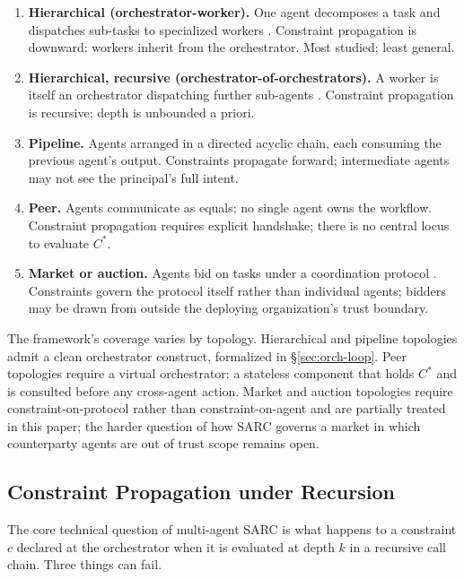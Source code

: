 \documentclass[11pt,a4paper]{article}
\theoremstyle{remark}
\begin{document}
\begin{enumerate}[leftmargin=2em,topsep=0.3em,itemsep=0.4em]
\item \textbf{Hierarchical (orchestrator-worker).} One agent decomposes a task and dispatches sub-tasks to specialized workers \cite{wu2023autogen}. Constraint propagation is downward: workers inherit from the orchestrator. Most studied; least general.
\item \textbf{Hierarchical, recursive (orchestrator-of-orchestrators).} A worker is itself an orchestrator dispatching further sub-agents \cite{hong2024metagpt}. Constraint propagation is recursive; depth is unbounded a priori.
\item \textbf{Pipeline.} Agents arranged in a directed acyclic chain, each consuming the previous agent's output. Constraints propagate forward; intermediate agents may not see the principal's full intent.
\item \textbf{Peer.} Agents communicate as equals; no single agent owns the workflow. Constraint propagation requires explicit handshake; there is no central locus to evaluate $C^*$.
\item \textbf{Market or auction.} Agents bid on tasks under a coordination protocol \cite{li2024marketauction}. Constraints govern the protocol itself rather than individual agents; bidders may be drawn from outside the deploying organization's trust boundary.
\end{enumerate}

The framework's coverage varies by topology. Hierarchical and pipeline topologies admit a clean orchestrator construct, formalized in \S\ref{sec:orch-loop}. Peer topologies require a virtual orchestrator: a stateless component that holds $C^*$ and is consulted before any cross-agent action. Market and auction topologies require constraint-on-protocol rather than constraint-on-agent and are partially treated in this paper; the harder question of how SARC governs a market in which counterparty agents are out of trust scope remains open.

\subsection{Constraint Propagation under Recursion}\label{sec:multi-prop}

The core technical question of multi-agent SARC is what happens to a constraint $c$ declared at the orchestrator when it is evaluated at depth $k$ in a recursive call chain. Three things can fail.
\end{document}
